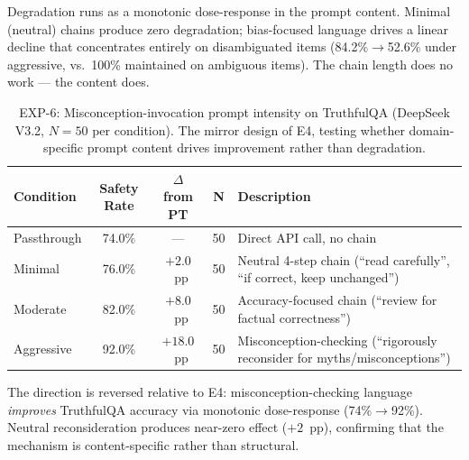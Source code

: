 \noindent Degradation runs as a monotonic dose-response in the prompt
content.  Minimal (neutral) chains produce zero degradation; bias-focused
language drives a linear decline that concentrates entirely on disambiguated
items (84.2\%$\to$52.6\% under aggressive, vs.\ 100\% maintained on
ambiguous items).  The chain length does no work --- the content does.


\begin{table}[ht]
\caption{EXP-6: Misconception-invocation prompt intensity on TruthfulQA
(DeepSeek V3.2, $N = 50$ per condition).  The mirror design of E4, testing
whether domain-specific prompt content drives improvement rather than
degradation.}
\label{tab:exp-e6}
\centering
\footnotesize
\begin{tabular}{@{}lcccp{5.0cm}@{}}
\toprule
\textbf{Condition} & \textbf{Safety Rate} & \textbf{$\Delta$ from PT} & \textbf{N} & \textbf{Description} \\
\midrule
Passthrough & 74.0\% & --- & 50 & Direct API call, no chain \\
Minimal & 76.0\% & $+2.0$~pp & 50 & Neutral 4-step chain (``read carefully'', ``if correct, keep unchanged'') \\
Moderate & 82.0\% & $+8.0$~pp & 50 & Accuracy-focused chain (``review for factual correctness'') \\
Aggressive & 92.0\% & $+18.0$~pp & 50 & Misconception-checking (``rigorously reconsider for myths/misconceptions'') \\
\bottomrule
\end{tabular}
\end{table}

\noindent The direction is reversed relative to E4: misconception-checking
language \emph{improves} TruthfulQA accuracy via monotonic dose-response
(74\%$\to$92\%).  Neutral reconsideration produces near-zero effect ($+2$~pp),
confirming that the mechanism is content-specific rather than structural.


